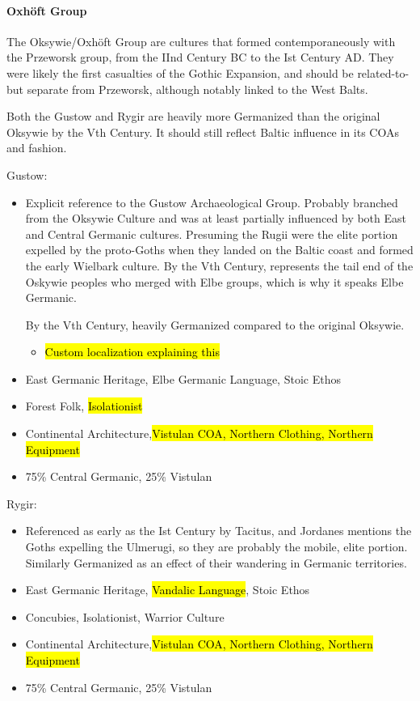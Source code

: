 \documentclass{article}
\begin{document}
	\paragraph{Oxhöft Group}
	The Oksywie/Oxhöft Group are cultures that formed contemporaneously with the Przeworsk group, from the IInd Century BC to the Ist Century AD.
	They were likely the first casualties of the Gothic Expansion, and should be related-to-but separate from Przeworsk, although notably linked to the West Balts.
	
	Both the Gustow and Rygir are heavily more Germanized than the original Oksywie by the Vth Century. It should still reflect Baltic influence in its COAs and fashion.
	
	Gustow:
	\begin{itemize}
		\item Explicit reference to the Gustow Archaeological Group.
		Probably branched from the Oksywie Culture and was at least partially influenced by both East and Central Germanic cultures.
		Presuming the Rugii were the elite portion expelled by the proto-Goths when they landed on the Baltic coast and formed the early Wielbark culture.
		By the Vth Century, represents the tail end of the Oskywie peoples who merged with Elbe groups, which is why it speaks Elbe Germanic.
		
		By the Vth Century, heavily Germanized compared to the original Oksywie.
		\begin{itemize}
			\item \hl{Custom localization explaining this}
		\end{itemize}
		\item East Germanic Heritage, Elbe Germanic Language, Stoic Ethos
		\item Forest Folk, \hl{Isolationist}
		\item Continental Architecture,\hl{Vistulan COA, Northern Clothing, Northern Equipment}
		\item 75\% Central Germanic, 25\% Vistulan
	\end{itemize}
	
	Rygir:
	\begin{itemize}
		\item Referenced as early as the Ist Century by Tacitus, and Jordanes mentions the Goths expelling the Ulmerugi, so they are probably the mobile, elite portion. Similarly Germanized as an effect of their wandering in Germanic territories.
		\item East Germanic Heritage, \hl{Vandalic Language}, Stoic Ethos
		\item Concubies, Isolationist, Warrior Culture
		\item Continental Architecture,\hl{Vistulan COA, Northern Clothing, Northern Equipment}
		\item 75\% Central Germanic, 25\% Vistulan
	\end{itemize}
	
\end{document}
